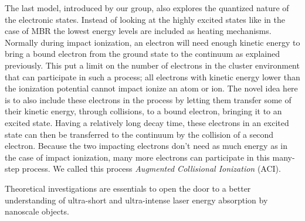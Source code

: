 The last model, introduced by our group, also explores the quantized nature of
the electronic states. Instead of looking at the highly excited states like
in the case of MBR the lowest energy levels are included as heating mechanisms.
Normally during impact ionization, an electron will need enough kinetic energy
to bring a bound electron from the ground state to the continuum as explained
previously. This put a limit on the number of electrons in the cluster
environment that can participate in such a process; all electrons with
kinetic energy lower than the ionization potential cannot impact ionize an atom
or ion. The novel idea here is to also include these electrons in the process
by letting them transfer some of their kinetic energy, through collisions, to a
bound electron, bringing it to an excited state. Having a relatively long decay
time, these electrons in an excited state can then be transferred to the
continuum by the collision of a second electron. Because the two impacting
electrons don't need as much energy as in the case of impact ionization, many
more electrons can participate in this many-step process. We called this
process \textit{Augmented Collisional Ionization} (ACI).



Theoretical investigations are essentials to open the door to a better
understanding of ultra-short and ultra-intense laser energy absorption by
nanoscale objects.


